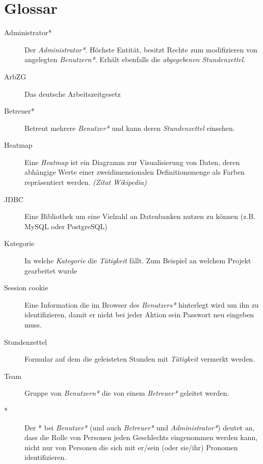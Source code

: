 \section{Glossar}
\begin{description}
	\item[Administrator*] Der \emph{Administrator*}. Höchste Entität, besitzt Rechte zum modifizieren von angelegten \emph{Benutzern*}.
	               Erhält ebenfalls die \emph{abgegebenen Stundenzettel}.

	\item[ArbZG] Das deutsche Arbeitszeitgesetz

	\item[Betreuer*] Betreut mehrere \emph{Benutzer*} und kann deren \emph{Stundenzettel} einsehen.

	\item[Heatmap] Eine \emph{Heatmap} ist ein Diagramm zur Visualisierung von Daten, deren abhängige Werte einer zweidimensionalen Definitionsmenge als Farben repräsentiert werden.  \emph{(Zitat Wikipedia)}

	\item[JDBC] Eine Bibliothek um eine Vielzahl an Datenbanken nutzen zu können (z.B. MySQL oder PostgreSQL)

	\item[Kategorie] In welche \emph{Kategorie} die \emph{Tätigkeit} fällt. Zum Beispiel an welchem Projekt gearbeitet wurde

	\item[Session cookie] Eine Information die im Browser des \emph{Benutzers*} hinterlegt wird um ihn zu identifizieren, damit er nicht bei jeder Aktion sein Passwort neu eingeben muss.

	\item[Stundenzettel] Formular auf dem die geleisteten Stunden mit \emph{Tätigkeit} vermerkt werden.

	\item[Team] Gruppe von \emph{Benutzern*} die von einem \emph{Betreuer*} geleitet werden.

	\item[*] Der * bei \emph{Benutzer*} (und auch \emph{Betreuer*} und \emph{Administrator*}) deutet an, dass die Rolle von Personen jeden Geschlechts eingenommen werden kann, nicht nur von Personen die sich mit er/sein (oder sie/ihr) Pronomen identifizieren.

\end{description}
